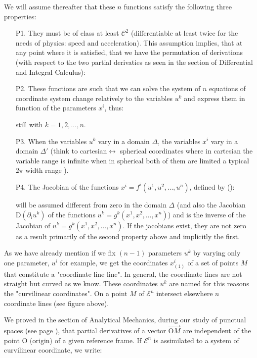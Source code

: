 	We will assume thereafter that these $n$ functions satisfy the following three properties:
	\begin{itemize}
		\item[P1.] They must be of class at least $\mathcal{C}^2$ (differentiable at least twice for the needs of physics: speed and acceleration). This assumption implies, that at any point where it is satisfied, that we have the permutation of derivations (with respect to the two partial derivaties as seen in the section of Differential and Integral Calculus):
		

		\item[P2.] These functions are such that we can solve the system of $n$ equations of coordinate system change relatively to the variables $u^k$ and express them in function of the parameters $x^i$, thus:
		
		still with $k=1,2, \ldots,n$.

		\item[P3.] When the variables $u^k$ vary in a domain $\Delta$, the variables $x^i$ vary in a domain $\Delta'$ (think to cartesian$\leftrightarrow$ spherical coordinates where in cartesian the variable range is infinite when in spherical both of them are limited a typical $2\pi$ width range ). 

		\item[P4.] The Jacobian of the functions $x^i=f^i(u^1,u^2,\ldots,u^n)$, defined by ():
		
		will be assumed different from zero in the domain $\Delta$ (and also the Jacobian $\mathrm{D}(\partial_i u^k)$ of the functions $u^k=g^k(x^1,x^2,\ldots,x^n)$) and is the inverse of the Jacobian of $u^k=g^k(x^1,x^2,\ldots,x^n)$. If the jacobians exist, they are not zero as a result primarily of the second property above and implicitly the first.
	\end{itemize}
	As we have already mention if we fix $(n-1)$ parameters $u^k$ by varying only one parameter, $u^i$ for example, we get the coordinates $x_{(1)}^i$ of a set of points $M$ that constitute a "coordinate line line". In general, the coordinate lines are not straight but curved as we know. These coordinates $u^k$ are named for this reasons the "curvilinear coordinates". On a point $M$ of $\mathcal{E}^n$ intersect elsewhere $n$ coordinate lines (see figure above).
	
	We proved in the section of Analytical Mechanics, during our study of punctual spaces (see page \pageref{point spaces}), that partial derivatives of a vector $\overrightarrow{\text{O}M}$ are independent of the point O (origin) of a given reference frame. If $\mathcal{E}^n$ is assimilated to a system of curvilinear coordinate, we write:
	
